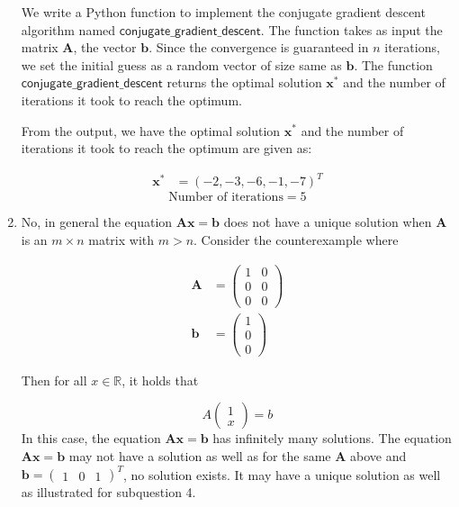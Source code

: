 \documentclass[12pt,a4paper]{article}
\newcommand{\R}{\mathbb{R}}
\theoremstyle{remark}
\begin{document}
\begin{enumerate}
    We write a Python function to implement the conjugate gradient descent algorithm named $\mathsf{conjugate\_gradient\_descent}$. The function takes as input the matrix $\mathbf{A}$, the vector $\mathbf{b}$. Since the convergence is guaranteed in $n$ iterations, we set the initial guess as a random vector of size same as $\mathbf{b}$. The function $\mathsf{conjugate\_gradient\_descent}$ returns the optimal solution $\mathbf{x}^*$ and the number of iterations it took to reach the optimum.

    From the output, we have the optimal solution $\mathbf{x}^*$ and the number of iterations it took to reach the optimum are given as:

    \begin{align*}
        \mathbf{x}^* &= (-2, -3, -6, -1, -7)^T
    \end{align*}
    $$\text{Number of iterations} = 5$$

    \item No, in general the equation $\mathbf{Ax = b}$ does not have a unique solution when $\mathbf{A}$ is an $m \times n$ matrix with $m > n$. Consider the counterexample where
    
    \begin{align*}
        \mathbf{A} &= \begin{pmatrix}
            1 & 0 \\
            0 & 0 \\
            0 & 0
        \end{pmatrix} \\
        \mathbf{b} &= \begin{pmatrix}
            1 \\
            0 \\
            0
        \end{pmatrix}
    \end{align*}

    Then for all $x \in \R$, it holds that

    $$A \begin{pmatrix}
        1 \\
        x
    \end{pmatrix} = b$$ In this case, the equation $\mathbf{Ax = b}$ has infinitely many solutions. The equation $\mathbf{Ax = b}$ may not have a solution as well as for the same $\mathbf{A}$ above and $\mathbf{b} = \begin{pmatrix}
        1 & 0 & 1
    \end{pmatrix}^T$, no solution exists. It may have a unique solution as well as illustrated for subquestion 4.
    

\end{enumerate}
\end{document}
